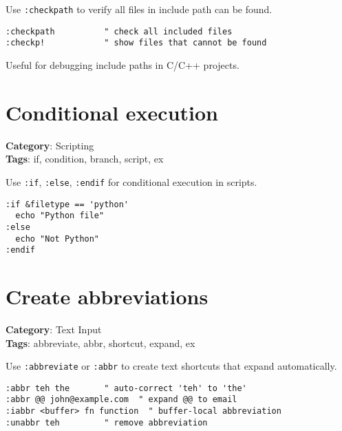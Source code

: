 {{{{{Use {\footnotesize \Verb§:checkpath§} to verify all files in include path can be found.

\begin{Exa*}{}
\begin{Verbatim}[fontsize=\footnotesize, breaklines, breakanywhere]
:checkpath          " check all included files
:checkp!            " show files that cannot be found
\end{Verbatim}
\end{Exa*}

Useful for debugging include paths in C/C++ projects.

\section{Conditional execution}

\textbf{Category}: Scripting\\ \textbf{Tags}: if, condition, branch, script, ex
\vspace{0.5cm}

Use {\footnotesize \Verb§:if§}, {\footnotesize \Verb§:else§}, {\footnotesize \Verb§:endif§} for conditional execution in scripts.

\begin{Exa*}{}
\begin{Verbatim}[fontsize=\footnotesize, breaklines, breakanywhere]
:if &filetype == 'python'
  echo "Python file"
:else
  echo "Not Python"
:endif
\end{Verbatim}
\end{Exa*}

\section{Create abbreviations}

\textbf{Category}: Text Input\\ \textbf{Tags}: abbreviate, abbr, shortcut, expand, ex
\vspace{0.5cm}

Use {\footnotesize \Verb§:abbreviate§} or {\footnotesize \Verb§:abbr§} to create text shortcuts that expand automatically.

\begin{Exa*}{}
\begin{Verbatim}[fontsize=\footnotesize, breaklines, breakanywhere]
:abbr teh the       " auto-correct 'teh' to 'the'
:abbr @@ john@example.com  " expand @@ to email
:iabbr <buffer> fn function  " buffer-local abbreviation
:unabbr teh         " remove abbreviation
\end{Verbatim}
\end{Exa*}

}}}}}
